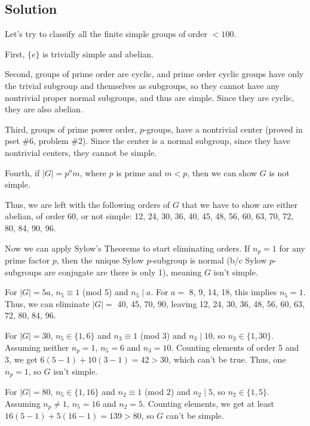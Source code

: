 \documentclass[fleqn]{article}
\begin{document}
        \subsection{Solution}
        Let's try to classify all the finite simple groups of order $< 100$.  
        
        First, $\{e\}$ is trivially simple and abelian.  
        
        Second, groups of prime order are cyclic, and prime order cyclic groups have only the trivial subgroup and themselves as subgroups, so they cannot have any nontrivial proper normal subgroups, and thus are simple.  Since they are cyclic, they are also abelian.  
        
        Third, groups of prime power order, $p$-groups, have a nontrivial center (proved in pset \#6, problem \#2).  Since the center is a normal subgroup, since they have nontrivial centers, they cannot be simple.
        
        Fourth, if $|G| = p^a m$, where $p$ is prime and $m < p$, then we can show $G$ is not simple.
        
        Thus, we are left with the following orders of $G$ that we have to show are either abelian, of order 60, or not simple: 12, 24, 30, 36, 40, 45, 48, 56, 60, 63, 70, 72, 80, 84, 90, 96.
        
        Now we can apply Sylow's Theorems to start eliminating orders.  If $n_p = 1$ for any prime factor $p$, then the unique Sylow $p$-subgroup is normal (b/c Sylow $p$-subgroups are conjugate are there is only 1), meaning $G$ isn't simple.
        
        For $|G| = 5a$, $n_5 \equiv 1$ (mod 5) and $n_5 \mid a$.  For $a =$ 8, 9, 14, 18, this implies $n_5 = 1$.  Thus, we can eliminate $|G| =$ 40, 45, 70, 90, leaving 12, 24, 30, 36, 48, 56, 60, 63, 72, 80, 84, 96.
        
        For $|G| = 30$, $n_5 \in \{1, 6\}$ and $n_3 \equiv 1$ (mod 3) and $n_3 \mid 10$, so $n_3 \in \{1, 30\}$.  Assuming neither $n_p = 1$, $n_5 = 6$ and $n_3 = 10$.  Counting elements of order 5 and 3, we get $6(5 - 1) + 10(3 - 1) = 42 > 30$, which can't be true.  Thus, one $n_p = 1$, so $G$ isn't simple.
        
        For $|G| = 80$, $n_5 \in \{1, 16\}$ and $n_2 \equiv 1$ (mod 2) and $n_2 \mid 5$, so $n_2 \in \{1, 5\}$.  Assuming $n_p \neq 1$, $n_5 = 16$ and $n_2 = 5$.  Counting elements, we get at least $16(5 - 1) + 5(16 - 1) = 139 > 80$, so $G$ can't be simple.
        
\end{document}
